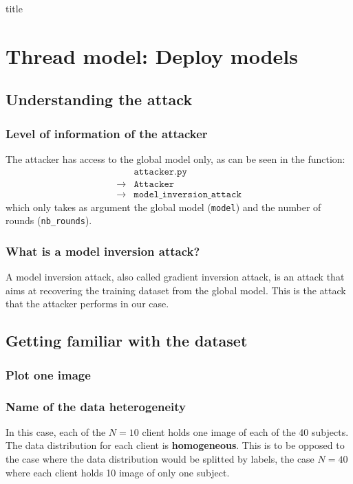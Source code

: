 \documentclass[12pt]{article}
\begin{document}
{title}

\tableofcontents




\section{Thread model: Deploy models}
\subsection{Understanding the attack}
\subsubsection{Level of information of the attacker}
The attacker has access to the global model only, as can be seen in the function:
\begin{align*}
              & \texttt{attacker.py}              \\
  \rightarrow & \texttt{Attacker}                 \\
  \rightarrow & \texttt{model\_inversion\_attack}
\end{align*}
which only takes as argument the global model (\texttt{model}) and the number of rounds (\texttt{nb\_rounds}).

\subsubsection{What is a model inversion attack?}
A model inversion attack, also called gradient inversion attack, is an attack that aims at recovering the training dataset from the global model. This is the attack that the attacker performs in our case.

\subsection{Getting familiar with the dataset}
\subsubsection{Plot one image}

\subsubsection{Name of the data heterogeneity}
In this case, each of the $N = 10$ client holds one image of each of the 40 subjects. The data distribution for each client is \textbf{homogeneous}. This is to be opposed to the case where the data distribution would be splitted by labels, \eg the case $N = 40$ where each client holds 10 image of only one subject.
\end{document}
